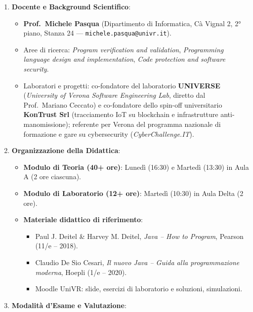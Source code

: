 \documentclass[11pt,a4paper]{article}
\newcommand{\passthrough}[1]{#1}
\providecommand{\tightlist}{\setlength{\itemsep}{0pt}\setlength{\parskip}{0pt}}
\begin{document}
\begin{enumerate}
\def\labelenumi{\arabic{enumi}.}
\tightlist
\item
  \textbf{Docente e Background Scientifico}:

  \begin{itemize}
  \tightlist
  \item
    \textbf{Prof.~Michele Pasqua} (Dipartimento di Informatica, Cà
    Vignal 2, 2° piano, Stanza 24 ---
    \passthrough{\lstinline!michele.pasqua@univr.it!}).
  \item
    Aree di ricerca: \emph{Program verification and validation},
    \emph{Programming language design and implementation}, \emph{Code
    protection and software security}.
  \item
    Laboratori e progetti: co-fondatore del laboratorio
    \textbf{UNIVERSE} (\emph{University of Verona Software Engineering
    Lab}, diretto dal Prof.~Mariano Ceccato) e co-fondatore dello
    spin-off universitario \textbf{KonTrust Srl} (tracciamento IoT su
    blockchain e infrastrutture anti-manomissione); referente per Verona
    del programma nazionale di formazione e gare su cybersecurity
    (\emph{CyberChallenge.IT}).
  \end{itemize}
\item
  \textbf{Organizzazione della Didattica}:

  \begin{itemize}
  \tightlist
  \item
    \textbf{Modulo di Teoria (40+ ore)}: Lunedì (16:30) e Martedì
    (13:30) in Aula A (2 ore ciascuna).
  \item
    \textbf{Modulo di Laboratorio (12+ ore)}: Martedì (10:30) in Aula
    Delta (2 ore).
  \item
    \textbf{Materiale didattico di riferimento}:

    \begin{itemize}
    \tightlist
    \item
      Paul J. Deitel \& Harvey M. Deitel, \emph{Java -- How to Program},
      Pearson (11/e -- 2018).
    \item
      Claudio De Sio Cesari, \emph{Il nuovo Java -- Guida alla
      programmazione moderna}, Hoepli (1/e -- 2020).
    \item
      Moodle UniVR: slide, esercizi di laboratorio e soluzioni,
      simulazioni.
    \end{itemize}
  \end{itemize}
\item
  \textbf{Modalità d'Esame e Valutazione}:


\end{enumerate}
\end{document}
